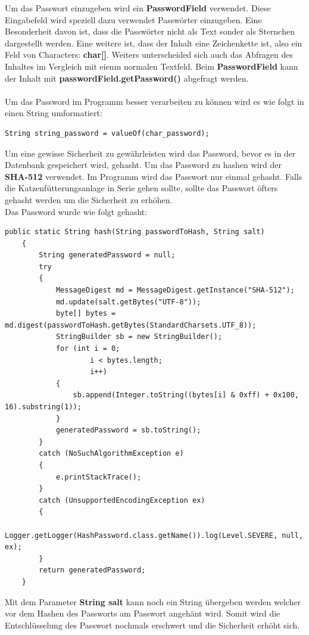 \vspace{10pt}

Um das Passwort einzugeben wird ein \textbf{PasswordField} verwendet. Diese Eingabefeld wird speziell dazu verwendet Passwörter einzugeben. Eine Besonderheit davon ist, dass die Passwörter nicht als Text sonder als Sternchen dargestellt werden. Eine weitere ist, dass der Inhalt eine Zeichenkette ist, also ein Feld von Characters: \textbf{char[]}. Weiters unterscheided sich auch das Abfragen des Inhaltes im Vergleich mit eienm normalen Textfeld. Beim \textbf{PasswordField} kann der Inhalt mit \textbf{passwordField.getPassword()} abgefragt werden.
\\ \\ Um das Password im Programm besser verarbeiten zu können wird es wie folgt in einen String umformatiert:
\begin{lstlisting}[style=Javastyle, caption=char zu String]
	String string_password = valueOf(char_password);
\end{lstlisting}

\vspace{10pt}

Um eine gewisse Sicherheit zu gewährleisten wird das Password, bevor es in der Datenbank gespeichert wird, gehasht. Um das Password zu hashen wird der \textbf{SHA-512} verwendet. Im Programm wird das Passwort nur einmal gehasht. Falls die Katzenfütterungsanlage in Serie gehen sollte, sollte das Passwort öfters gehasht werden um die Sicherheit zu erhöhen.
\\ Das Password wurde wie folgt gehasht:
\begin{lstlisting}[style=Javastyle, caption=Hash Passwort]
	public static String hash(String passwordToHash, String salt)
    {
        String generatedPassword = null;
        try
        {
            MessageDigest md = MessageDigest.getInstance("SHA-512");
            md.update(salt.getBytes("UTF-8"));
            byte[] bytes = md.digest(passwordToHash.getBytes(StandardCharsets.UTF_8));
            StringBuilder sb = new StringBuilder();
            for (int i = 0;
                    i < bytes.length;
                    i++)
            {
                sb.append(Integer.toString((bytes[i] & 0xff) + 0x100, 16).substring(1));
            }
            generatedPassword = sb.toString();
        }
        catch (NoSuchAlgorithmException e)
        {
            e.printStackTrace();
        }
        catch (UnsupportedEncodingException ex)
        {
            Logger.getLogger(HashPassword.class.getName()).log(Level.SEVERE, null, ex);
        }
        return generatedPassword;
    }
\end{lstlisting}
Mit dem Parameter \textbf{String salt} kann noch ein String übergeben werden welcher vor dem Hashen des Passworts am Passwort angehänt wird. Somit wird die Entschlüsselung des Passwort nochmals erschwert und die Sicherheit erhöht sich.

